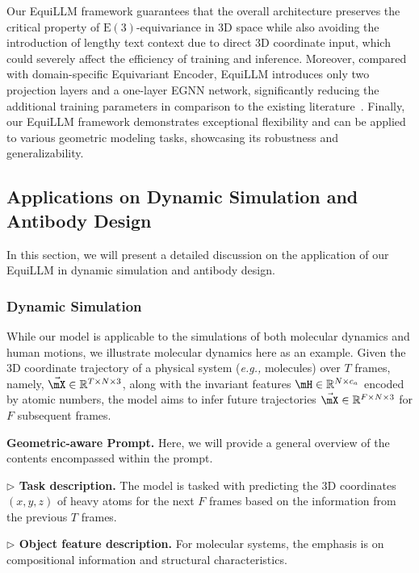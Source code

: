 Our EquiLLM framework guarantees that the overall architecture preserves the critical property of $\mathrm{E}(3)$-equivariance in 3D space while also avoiding the introduction of lengthy text context due to direct 3D coordinate input, which could severely affect the efficiency of training and inference. Moreover, compared with domain-specific Equivariant Encoder, EquiLLM introduces only two projection layers and a one-layer EGNN network, significantly reducing the additional training parameters in comparison to the existing literature~\citep{jin2024timellm, yuan2024unist}. Finally, our EquiLLM framework demonstrates exceptional flexibility and can be applied to various geometric modeling tasks, showcasing its robustness and generalizability.

\subsection{Applications on Dynamic Simulation and Antibody Design}
\label{sec:3.3}
In this section, we will present a detailed discussion on the application of our EquiLLM in dynamic simulation and antibody design.
\subsubsection{Dynamic Simulation}
\label{sec:3.3.1}
While our model is applicable to the simulations of both molecular dynamics and human motions, we illustrate molecular dynamics here as an example. Given the 3D coordinate trajectory of a physical system (\emph{e.g.,} molecules) over $T$ frames, namely, $\Vec{\mX}\in\mathbb{R}^{T \times N \times 3}$, along with the invariant features $\mH\in\mathbb{R}^{N \times c_{a}}$ encoded by atomic numbers, the model aims to infer future trajectories $\Vec{\mX}\in\mathbb{R}^{F \times N \times 3}$ for $F$ subsequent frames.

\textbf{Geometric-aware Prompt.}
Here, we will provide a general overview of the contents encompassed within the prompt.

\textbf{$\triangleright$ Task description.} The model is tasked with predicting the 3D coordinates $(x, y, z)$ of heavy atoms for the next $F$ frames based on the information from the previous $T$ frames.

\textbf{$\triangleright$ Object feature description.} For molecular systems, the emphasis is on compositional information and structural characteristics.


